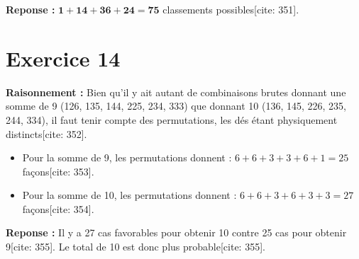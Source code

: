 \documentclass[11pt,a4paper]{article}
\begin{document}
\textbf{Reponse :} $\mathbf{1 + 14 + 36 + 24 = 75}$ classements possibles[cite: 351].

\hrulefill

\section*{Exercice 14}

\textbf{Raisonnement :} Bien qu'il y ait autant de combinaisons brutes donnant une somme de 9 (126, 135, 144, 225, 234, 333) que donnant 10 (136, 145, 226, 235, 244, 334), il faut tenir compte des permutations, les dés étant physiquement distincts[cite: 352].
\begin{itemize}
    \item Pour la somme de 9, les permutations donnent : $6 + 6 + 3 + 3 + 6 + 1 = 25$ façons[cite: 353].
    \item Pour la somme de 10, les permutations donnent : $6 + 6 + 3 + 6 + 3 + 3 = 27$ façons[cite: 354].
\end{itemize}

\textbf{Reponse :} Il y a 27 cas favorables pour obtenir 10 contre 25 cas pour obtenir 9[cite: 355]. Le total de 10 est donc plus probable[cite: 355].
\end{document}
